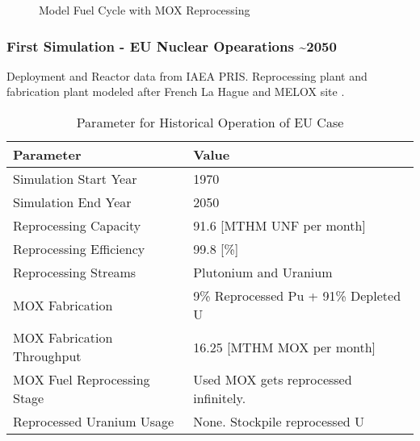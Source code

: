 \begin{frame}
\begin{figure}
\begin{adjustbox}{max totalsize={0.9\textwidth}{.8\textheight}, center}
                \end{adjustbox}
                
                \caption{Model Fuel Cycle with \gls{MOX} Reprocessing}
                \label{diag:fc}
\end{figure}
\end{frame}

\begin{frame}
	\frametitle{First Simulation - EU Nuclear Opearations \textasciitilde 2050}
	Deployment and Reactor data from \gls{IAEA} \gls{PRIS}.
	Reprocessing plant and fabrication plant modeled after French La Hague and MELOX site
	\cite{schneider_spent_2008, hugelmann_melox_1999}.
		
\begin{table}[h]
	\centering
	\begin{tabularx}{\textwidth}{bb}
		\hline
		Parameter & Value \\
		\hline
		Simulation Start Year & 1970   \\
		Simulation End Year & 2050  \\ 
		Reprocessing Capacity & 91.6 [MTHM \gls{UNF} per month] \cite{schneider_spent_2008}  \\
		Reprocessing Efficiency & 99.8 [\%] \\
		Reprocessing Streams & Plutonium and Uranium  \\
		\gls{MOX} Fabrication & \small{9\% Reprocessed Pu + 91\% Depleted U} \\
		\gls{MOX} Fabrication Throughput & 16.25 [MTHM \gls{MOX} per month]  \cite{hugelmann_melox_1999} \\
		\gls{MOX} Fuel Reprocessing Stage &  Used \gls{MOX} gets reprocessed infinitely. \\  
		Reprocessed Uranium Usage &  None. Stockpile reprocessed U \\
		\hline
	\end{tabularx}
	\caption {Parameter for Historical Operation of \gls{EU} Case}
	\label{tab:sim_eu}
\end{table}
	
\end{frame}

